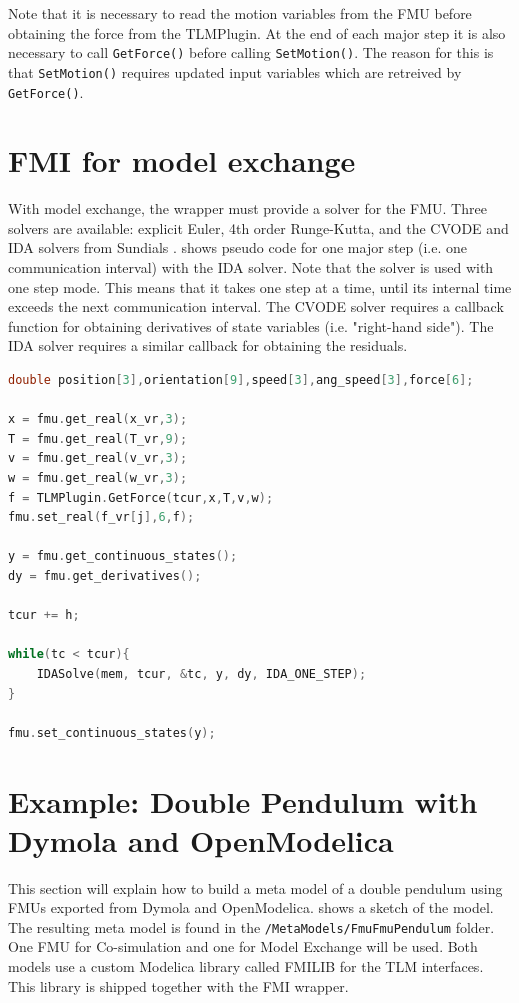\documentclass[11pt,a4paper,english]{report}
\begin{document}
Note that it is necessary to read the motion variables from the FMU before obtaining the force from the TLMPlugin. 
At the end of each major step it is also necessary to call \texttt{GetForce()} before calling \texttt{SetMotion()}.
The reason for this is that \texttt{SetMotion()} requires updated input variables which are retreived by \texttt{GetForce()}.

\vspace{0cm}

\clearpage
\section{FMI for model exchange}
\label{sec:fmi_me}
With model exchange, the wrapper must provide a solver for the FMU.
Three solvers are available: explicit Euler, 4th order Runge-Kutta, and the CVODE and IDA solvers from Sundials \cite{hindmarsh2005}.
 shows pseudo code for one major step (i.e. one communication interval) with the IDA solver.
Note that the solver is used with one step mode.
This means that it takes one step at a time, until its internal time exceeds the next communication interval.
The CVODE solver requires a callback function for obtaining derivatives of state variables (i.e. "right-hand side").
The IDA solver requires a similar callback for obtaining the residuals.

\begin{lstlisting}[language=c++, basicstyle=\ttfamily\small,floatplacement=h,caption=Pseudo code for the simulation loop with FMI for model exchange,label=lst:wrapper_me]
double position[3],orientation[9],speed[3],ang_speed[3],force[6];

x = fmu.get_real(x_vr,3);
T = fmu.get_real(T_vr,9);
v = fmu.get_real(v_vr,3);
w = fmu.get_real(w_vr,3);
f = TLMPlugin.GetForce(tcur,x,T,v,w);
fmu.set_real(f_vr[j],6,f);

y = fmu.get_continuous_states();
dy = fmu.get_derivatives();

tcur += h;

while(tc < tcur){
    IDASolve(mem, tcur, &tc, y, dy, IDA_ONE_STEP);
}

fmu.set_continuous_states(y);
\end{lstlisting}

\clearpage
\section{Example: Double Pendulum with Dymola and OpenModelica}
This section will explain how to build a meta model of a double pendulum using FMUs exported from Dymola and OpenModelica.
 shows a sketch of the model.
The resulting meta model is found in the \texttt{/MetaModels/FmuFmuPendulum} folder.
One FMU for Co-simulation and one for Model Exchange will be used.
Both models use a custom Modelica library called FMILIB for the TLM interfaces.
This library is shipped together with the FMI wrapper.
\end{document}
